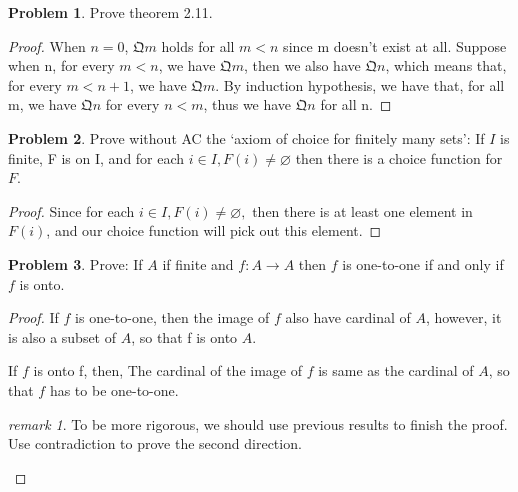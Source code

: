 \documentclass[a4paper,11pt]{article}%
\theoremstyle{remark}
\newtheorem*{remark}{remark}
\theoremstyle{definition}
\newtheorem{problem}{Problem}[subsection]
\begin{document}
\begin{problem}
    Prove theorem 2.11.
    \begin{proof}
        When $n=0$, $\mathfrak{Q}m$ holds for all $m<n$ since m doesn't exist at all.
        Suppose when n, for every $m<n$, we have $\mathfrak{Q}m$, then we also have $\mathfrak{Q}n$,
        which means that, for every $m<n+1$, we have $\mathfrak{Q}m$. By induction hypothesis, we have that,
        for all m, we have $\mathfrak{Q}n$ for every $n<m$, thus we have $\mathfrak{Q}n$ for all n. 
    \end{proof}
\end{problem}
\begin{problem}
    Prove without AC the `axiom of choice for finitely many sets': If $I$ is 
    finite, F is on I, and for each $i\in I,F(i)\neq \varnothing$ then there is 
    a choice function for $F$.
    \begin{proof}
       Since for each $i\in I, F(i)\neq \varnothing,$ then there is at least one element in 
       $F(i)$, and our choice function will pick out this element. 
    \end{proof}
\end{problem}
\begin{problem}
    Prove: If $A$ if finite and $f:A\rightarrow A$ then $f$ is one-to-one 
    if and only if $f$ is onto.
    \begin{proof}
        If $f$ is one-to-one, then the image of $f$ also have cardinal of $A$,
        however, it is also a subset of $A$, so that f is onto $A$.

        If $f$ is onto f, then, The cardinal of the image of $f$ is same as the 
        cardinal of $A$, so that $f$ has to be one-to-one.
        \begin{remark}
            To be more rigorous, we should use previous results to finish the proof.
            Use contradiction to prove the second direction.
        \end{remark}
    \end{proof}
\end{problem}
\end{document}
